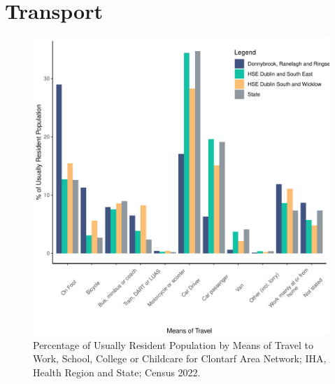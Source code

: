 \documentclass{article}
\begin{document}
\section{Transport}\label{sect:Trans}
\begin{figure}[H]
	\centering
	\includegraphics[width = 120mm]{../figures/TravelED.pdf}
	\caption{Percentage of Usually Resident Population by Means of Travel to Work, School, College or Childcare for Clontarf Area Network; IHA, Health Region and State; Census 2022.}
	\label{fig:vbnv}
	\end{figure}
\end{document}
